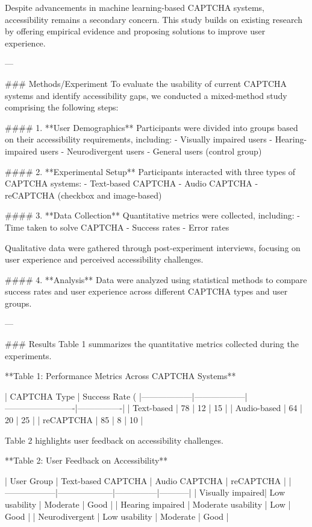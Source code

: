 Despite advancements in machine learning-based CAPTCHA systems, accessibility remains a secondary concern. This study builds on existing research by offering empirical evidence and proposing solutions to improve user experience.

---

### Methods/Experiment  
To evaluate the usability of current CAPTCHA systems and identify accessibility gaps, we conducted a mixed-method study comprising the following steps:

#### 1. **User Demographics**  
Participants were divided into groups based on their accessibility requirements, including:
   - Visually impaired users
   - Hearing-impaired users
   - Neurodivergent users
   - General users (control group)

#### 2. **Experimental Setup**  
Participants interacted with three types of CAPTCHA systems:
   - Text-based CAPTCHA
   - Audio CAPTCHA
   - reCAPTCHA (checkbox and image-based)

#### 3. **Data Collection**  
Quantitative metrics were collected, including:
   - Time taken to solve CAPTCHA
   - Success rates
   - Error rates

Qualitative data were gathered through post-experiment interviews, focusing on user experience and perceived accessibility challenges.

#### 4. **Analysis**  
Data were analyzed using statistical methods to compare success rates and user experience across different CAPTCHA types and user groups.

---

### Results  
Table 1 summarizes the quantitative metrics collected during the experiments.  

**Table 1: Performance Metrics Across CAPTCHA Systems**  

| CAPTCHA Type     | Success Rate (%
|------------------|------------------|-------------------------|----------------|  
| Text-based       | 78               | 12                      | 15             |  
| Audio-based      | 64               | 20                      | 25             |  
| reCAPTCHA        | 85               | 8                       | 10             |  

Table 2 highlights user feedback on accessibility challenges.  

**Table 2: User Feedback on Accessibility**  

| User Group       | Text-based CAPTCHA | Audio CAPTCHA | reCAPTCHA |  
|------------------|--------------------|---------------|-----------|  
| Visually impaired| Low usability      | Moderate      | Good      |  
| Hearing impaired | Moderate usability | Low           | Good      |  
| Neurodivergent   | Low usability      | Moderate      | Good      |  

